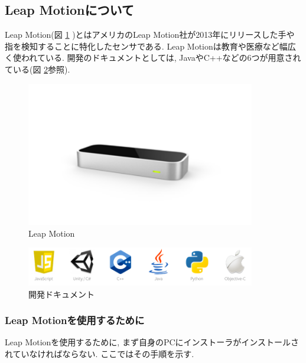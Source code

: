 \documentclass{funthesis}
\begin{document}
\subsection{Leap Motionについて}
Leap Motion(図 \ref{LeapMotion} )とはアメリカのLeap Motion社が2013年にリリースした手や指を検知することに特化したセンサである. Leap Motionは教育や医療など幅広く使われている. 開発のドキュメントとしては, JavaやC++などの6つが用意されている(図 \ref{Leapdoc}参照).



\begin{figure}[H]
 \begin{center}
  \includegraphics[width=100mm]{./img/LeapMotion.png}
 \end{center}
 \caption{Leap Motion}
 \label{LeapMotion}
\end{figure}

\begin{figure}[H]
 \begin{center}
  \includegraphics[width=100mm]{./img/Leapdoc.png}
 \end{center}
 \caption{開発ドキュメント}
 \label{Leapdoc}
\end{figure}

\subsubsection{Leap Motionを使用するために}
Leap Motionを使用するために, まず自身のPCにインストーラがインストールされていなければならない. ここではその手順を示す.\\
\end{document}
